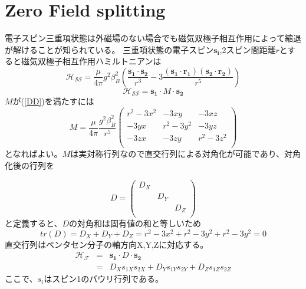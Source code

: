 \appendix
 \chapter{Zero Field splitting}
 電子スピン三重項状態は外磁場のない場合でも磁気双極子相互作用によって縮退が解けることが知られている。
 三重項状態の電子スピン$\mathbf{s_i}$,2スピン間距離$r$とすると磁気双極子相互作用ハミルトニアンは
 \begin{equation}
   \label{DD}
   \mathcal{H_{SS}}=\frac{\mu}{4\pi} g^2\beta_B^2(\frac{\mathbf{s_1} \cdot \mathbf{s_2}}{r^3}-3\frac{(\mathbf{s_1}\cdot \mathbf{r_1})(\mathbf{s_2}\cdot \mathbf{r_2})}{r^5})
 \end{equation}
 \begin{equation}
   \mathcal{H_{SS}}=\mathbf{s_1}\cdot M \cdot \mathbf{s_2}
 \end{equation}
 $M$が(\ref{DD})を満たすには
 \begin{displaymath}
   \label{M}
   M=\frac{\mu}{4\pi} \frac{g^2\beta_B^2}{r^5}
   \left( \begin{array}{rrr}
     r^2-3x^2 & -3xy & -3xz \\
         -3yx & r^2-3y^2 & -3yz \\
         -3zx & -3zy & r^2-3z^2 \\
     \end{array} \right) 
 \end{displaymath}
 となればよい。$M$は実対称行列なので直交行列による対角化が可能であり、対角化後の行列を
 
 \begin{displaymath}
   D=\left( \begin{array}{rrr}
     D_X & & \\
      & D_Y & \\
       & & D_Z\\
   \end{array} \right)
 \end{displaymath}
 と定義すると、$D$の対角和は固有値の和と等しいため
 \begin{equation}
  \label{tr}
   tr(D)=D_X+D_Y+D_Z=r^2-3x^2+r^2-3y^2+r^2-3y^2=0
 \end{equation}
 直交行列はペンタセン分子の軸方向X,Y,Zに対応する。
 \begin{eqnarray}
   \mathcal{H_F}&=&\mathbf{s_1}\cdot D \cdot \mathbf{s_2}\\
   \label{HF2}
   &=&D_Xs_{1X}s_{2X}+D_Ys_{1Y}s_{2Y}+D_Zs_{1Z}s_{2Z}
 \end{eqnarray}
 ここで、$s_i$はスピン1のパウリ行列である。
 
